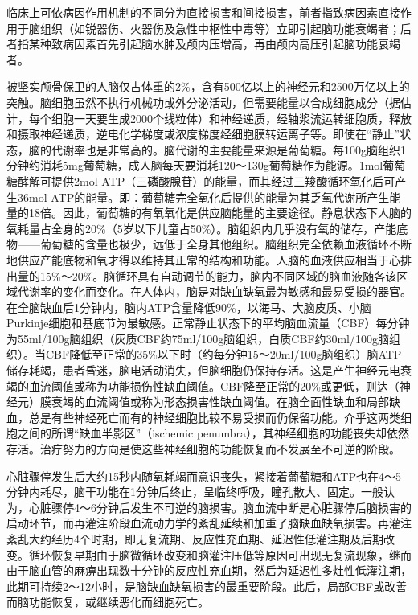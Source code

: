 临床上可依病因作用机制的不同分为直接损害和间接损害，前者指致病因素直接作用于脑组织（如锐器伤、火器伤及急性中枢性中毒等）立即引起脑功能衰竭者；后者指某种致病因素首先引起脑水肿及颅内压增高，再由颅内高压引起脑功能衰竭者。

被坚实颅骨保卫的人脑仅占体重的2\%，含有500亿以上的神经元和2500万亿以上的突触。脑细胞虽然不执行机械功或外分泌活动，但需要能量以合成细胞成分（据估计，每个细胞一天要生成2000个线粒体）和神经递质，经轴浆流运转细胞质，释放和摄取神经递质，逆电化学梯度或浓度梯度经细胞膜转运离子等。即使在“静止”状态，脑的代谢率也是非常高的。脑代谢的主要能量来源是葡萄糖。每100g脑组织1分钟约消耗5mg葡萄糖，成人脑每天要消耗120～130g葡萄糖作为能源。1mol葡萄糖酵解可提供2mol
ATP（三磷酸腺苷）的能量，而其经过三羧酸循环氧化后可产生36mol
ATP的能量。即：葡萄糖完全氧化后提供的能量为其乏氧代谢所产生能量的18倍。因此，葡萄糖的有氧氧化是供应脑能量的主要途径。静息状态下人脑的氧耗量占全身的20\%（5岁以下儿童占50\%）。脑组织内几乎没有氧的储存，产能底物------葡萄糖的含量也极少，远低于全身其他组织。脑组织完全依赖血液循环不断地供应产能底物和氧才得以维持其正常的结构和功能。人脑的血液供应相当于心排出量的15\%～20\%。脑循环具有自动调节的能力，脑内不同区域的脑血液随各该区域代谢率的变化而变化。在人体内，脑是对缺血缺氧最为敏感和最易受损的器官。在全脑缺血后1分钟内，脑内ATP含量降低90\%，以海马、大脑皮质、小脑Purkinje细胞和基底节为最敏感。正常静止状态下的平均脑血流量（CBF）每分钟为55ml/100g脑组织（灰质CBF约75ml/100g脑组织，白质CBF约30ml/100g脑组织）。当CBF降低至正常的35\%以下时（约每分钟15～20ml/100g脑组织）脑ATP储存耗竭，患者昏迷，脑电活动消失，但脑细胞仍保持存活。这是产生神经元电衰竭的血流阈值或称为功能损伤性缺血阈值。CBF降至正常的20\%或更低，则达（神经元）膜衰竭的血流阈值或称为形态损害性缺血阈值。在脑全面性缺血和局部缺血，总是有些神经死亡而有的神经细胞比较不易受损而仍保留功能。介乎这两类细胞之间的所谓“缺血半影区”（ischemic
penumbra），其神经细胞的功能丧失却依然存活。治疗努力的方向是使这些神经细胞的功能恢复而不发展至不可逆的阶段。

心脏骤停发生后大约15秒内随氧耗竭而意识丧失，紧接着葡萄糖和ATP也在4～5分钟内耗尽，脑干功能在1分钟后终止，呈临终呼吸，瞳孔散大、固定。一般认为，心脏骤停4～6分钟后发生不可逆的脑损害。脑血流中断是心脏骤停后脑损害的启动环节，而再灌注阶段血流动力学的紊乱延续和加重了脑缺血缺氧损害。再灌注紊乱大约经历4个时期，即无复流期、反应性充血期、延迟性低灌注期及后期改变。循环恢复早期由于脑微循环改变和脑灌注压低等原因可出现无复流现象，继而由于脑血管的麻痹出现数十分钟的反应性充血期，然后为延迟性多灶性低灌注期，此期可持续2～12小时，是脑缺血缺氧损害的最重要阶段。此后，局部CBF或改善而脑功能恢复，或继续恶化而细胞死亡。

